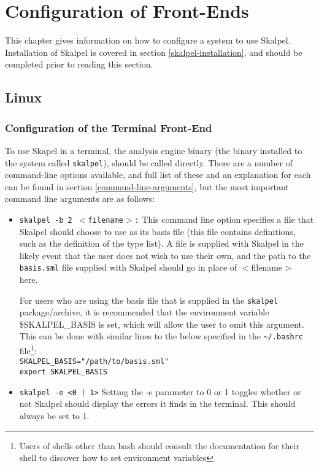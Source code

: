 \documentclass{report}
\begin{document}

\chapter{Configuration of Front-Ends}

This chapter gives information on how to configure a system to use
Skalpel. Installation of Skalpel is covered in section
\ref{skalpel-installation}, and should be completed prior to reading
this section.

\section{Linux}

\subsection{Configuration of the Terminal Front-End}
\label{skalpel-environment-vars}

To use Skapel in a terminal, the analysis engine binary (the binary
installed to the system called \texttt{skalpel}), should be called
directly. There are a number of command-line options available, and
full list of these and an explanation for each can be found in section
\ref{command-line-arguments}, but the most important command line
arguments are as follows:

\begin{itemize}
\item \texttt{skalpel -b 2 $<$filename$>$:} This command line option
  specifies a file that Skalpel should choose to use as its
  basis file (this file contains definitions, such as the definition of the
  type list). A file is supplied with Skalpel in the likely event that the
  user does not wish to use their own, and the path to the
  \texttt{basis.sml} file supplied with Skalpel should go in place of
  $<$filename$>$ here.

  For users who are using the basis file that is supplied in the
  \texttt{skalpel} package/archive, it is recommended that the
  environment variable \$SKALPEL\_BASIS is set, which will allow the
  user to omit this argument. This can be done with similar lines to
  the below specified in the \texttt{{\textasciitilde}/.bashrc} file\footnote{ Users of shells
    other than bash should consult the documentation for their shell
    to discover how to set environment variables}:\\

  \texttt{SKALPEL\_BASIS="/path/to/basis.sml"}\\
  \texttt{export SKALPEL\_BASIS}

\item \texttt{skalpel -e <0 | 1>} Setting the -e parameter to 0 or 1
  toggles whether or not Skalpel should display the errors it finds in
  the terminal. This should always be set to 1. 
\end{itemize}
\end{document}
